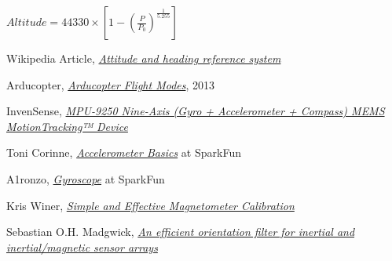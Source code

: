 \documentclass[a4paper,12pt,oneside]{book}
\begin{document}
\begin{minipage}{\textwidth}
\centering
$Altitude = 44330 \times \left [1 - \left (\frac{P}{P_{0}}\right )^{\frac{1}{5.255}} \right ]$
\end{minipage}
\clearpage

\begin{thebibliography}{20}

Wikipedia Article, \href{https://en.wikipedia.org/wiki/Attitude_and_heading_reference_system}{\textit{Attitude and heading reference system}}

Arducopter, \href{http://www.arducopter.co.uk/all-arducopter-guides/arducopter-flight-modes}{\textit{
Arducopter Flight Modes}}, 2013

InvenSense, \href{https://www.invensense.com/products/motion-tracking/9-axis/mpu-9250/}{\textit{MPU-9250 Nine-Axis (Gyro + Accelerometer + Compass) MEMS MotionTracking™ Device}}

Toni Corinne, \href{https://learn.sparkfun.com/tutorials/accelerometer-basics}{\textit{Accelerometer Basics}} at SparkFun

A1ronzo, \href{https://learn.sparkfun.com/tutorials/gyroscope/how-a-gyro-works}{\textit{Gyroscope}} at SparkFun

Kris Winer, \href{https://github.com/kriswiner/MPU6050/wiki/Simple-and-Effective-Magnetometer-Calibration}{\textit{Simple and Effective Magnetometer Calibration}}

Sebastian O.H. Madgwick, \href{./datasheets/Madgwick Internal Report.pdf}{\textit{An efficient orientation filter for inertial and inertial/magnetic sensor arrays}}

\end{thebibliography}

\end{document}

